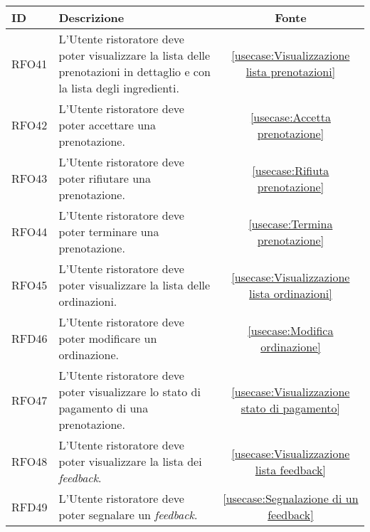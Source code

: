 \begin{table}[H]
	\renewcommand{\arraystretch}{1.5}
	\centering
	\begin{tabularx}{\textwidth}{l|X|c}
		\textbf{ID} & \textbf{Descrizione}                                                                                                    & \textbf{Fonte}                                                       \\
		\hline
		RFO41       & L'Utente ristoratore deve poter visualizzare la lista delle prenotazioni in dettaglio e con la lista degli ingredienti. & \autoref{usecase:Visualizzazione lista prenotazioni}                 \\
		\hline
		RFO42       & L'Utente ristoratore deve poter accettare una prenotazione.                                                             & \autoref{usecase:Accetta prenotazione}                               \\
		\hline
		RFO43       & L'Utente ristoratore deve poter rifiutare una prenotazione.                                                             & \autoref{usecase:Rifiuta prenotazione}                               \\
		\hline
		RFO44       & L'Utente ristoratore deve poter terminare una prenotazione.                                                             & \autoref{usecase:Termina prenotazione}                               \\
		\hline
		RFO45       & L'Utente ristoratore deve poter visualizzare la lista delle ordinazioni.                                                & \autoref{usecase:Visualizzazione lista ordinazioni}                  \\
		\hline
		RFD46       & L'Utente ristoratore deve poter modificare un ordinazione.                                                              & \autoref{usecase:Modifica ordinazione}                               \\
		\hline
		RFO47       & L'Utente ristoratore deve poter visualizzare lo stato di pagamento di una prenotazione.                                 & \autoref{usecase:Visualizzazione stato di pagamento}                 \\
		\hline
		RFO48       & L'Utente ristoratore deve poter visualizzare la lista dei \textit{feedback}.                                            & \autoref{usecase:Visualizzazione lista feedback}                     \\
		\hline
		RFD49       & L'Utente ristoratore deve poter segnalare un \textit{feedback}.                                                         & \autoref{usecase:Segnalazione di un feedback}                        \\

\end{tabularx}
\end{table}
